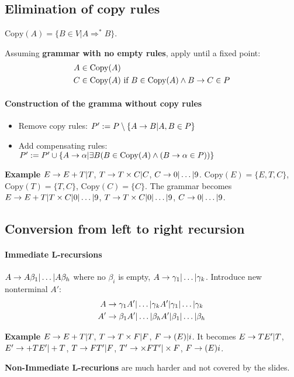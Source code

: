 \subsection{Elimination of copy rules}
$\text{Copy}(A) = \{ B \in V | A \Rightarrow^* B \}$.

Assuming \textbf{grammar with no empty rules}, apply until a fixed point:
\begin{align*}
    A &\in \text{Copy}(A) \\
    C &\in \text{Copy}(A) \text{ if } B \in \text{Copy}(A) \land B \rightarrow C \in P
\end{align*}

\paragraph{Construction of the gramma without copy rules}

\begin{itemize}
    \item Remove copy rules: $P' := P \setminus \{A\rightarrow B | A, B \in P\}$
    \item Add compensating rules: $P' := P' \cup \{ A \rightarrow \alpha | \exists B (B \in \text{Copy}(A) \land (B \rightarrow \alpha \in P)) \}$
\end{itemize}

\textbf{Example} $E \rightarrow E + T | T$, $T \rightarrow T \times C | C$, $C \rightarrow 0|\ldots|9$.
$\text{Copy}(E)=\{E,T,C\}$, $\text{Copy}(T) = \{T, C\}$, $\text{Copy}(C) = \{C\}$.
The grammar becomes $E \rightarrow E+T|T\times C|0|\ldots|9$, $T \rightarrow T\times C|0|\ldots|9$, $C \rightarrow 0|\ldots|9$.

\subsection{Conversion from left to right recursion}

\paragraph{Immediate L-recursions} $A \rightarrow A\beta_1 | \ldots | A\beta_h$ where no $\beta_i$ is empty, $A \rightarrow \gamma_1 | \ldots | \gamma_k$. Introduce new nonterminal $A'$:
\begin{align*}
    A &\rightarrow \gamma_1A' | \ldots | \gamma_kA' | \gamma_1 | \ldots | \gamma_k \\
    A' &\rightarrow \beta_1A' | \ldots | \beta_hA' | \beta_1 | \ldots | \beta_h
\end{align*}

\textbf{Example} $E \rightarrow E+T | T$, $T \rightarrow T\times F | F$, $F \rightarrow (E) | i$. It becomes $E \rightarrow TE' | T$, $E' \rightarrow +TE'|+T$, $T \rightarrow FT'|F$, $T' \rightarrow \times FT'|\times F$, $F\rightarrow (E)i$.

\textbf{Non-Immediate L-recurions} are much harder and not covered by the slides.
